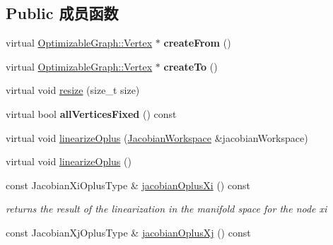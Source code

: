 \subsection*{Public 成员函数}
\begin{DoxyCompactItemize}
\item 
\hypertarget{classg2o_1_1BaseBinaryEdge_a32bfc93b6dede619c7d99db2fb60f80d}{virtual \hyperlink{classg2o_1_1OptimizableGraph_1_1Vertex}{Optimizable\-Graph\-::\-Vertex} $\ast$ {\bfseries create\-From} ()}\label{classg2o_1_1BaseBinaryEdge_a32bfc93b6dede619c7d99db2fb60f80d}

\item 
\hypertarget{classg2o_1_1BaseBinaryEdge_ac7cce17e3229445e5a33c3cb8a569320}{virtual \hyperlink{classg2o_1_1OptimizableGraph_1_1Vertex}{Optimizable\-Graph\-::\-Vertex} $\ast$ {\bfseries create\-To} ()}\label{classg2o_1_1BaseBinaryEdge_ac7cce17e3229445e5a33c3cb8a569320}

\item 
virtual void \hyperlink{classg2o_1_1BaseBinaryEdge_a06e64067fa5fff4a5e2d058249b55478}{resize} (size\-\_\-t size)
\item 
\hypertarget{classg2o_1_1BaseBinaryEdge_a1895c3b7141e93fd05bf271daeda7568}{virtual bool {\bfseries all\-Vertices\-Fixed} () const }\label{classg2o_1_1BaseBinaryEdge_a1895c3b7141e93fd05bf271daeda7568}

\item 
virtual void \hyperlink{classg2o_1_1BaseBinaryEdge_afc3b6470e7679f027c2614484b394925}{linearize\-Oplus} (\hyperlink{classg2o_1_1JacobianWorkspace}{Jacobian\-Workspace} \&jacobian\-Workspace)
\item 
virtual void \hyperlink{classg2o_1_1BaseBinaryEdge_af0fb8a693c8c7996fa65566e7263fbc4}{linearize\-Oplus} ()
\item 
\hypertarget{classg2o_1_1BaseBinaryEdge_ad036a59a5bc1d04d1799d61b9be15864}{const Jacobian\-Xi\-Oplus\-Type \& \hyperlink{classg2o_1_1BaseBinaryEdge_ad036a59a5bc1d04d1799d61b9be15864}{jacobian\-Oplus\-Xi} () const }\label{classg2o_1_1BaseBinaryEdge_ad036a59a5bc1d04d1799d61b9be15864}

\begin{DoxyCompactList}\small\item\em returns the result of the linearization in the manifold space for the node xi \end{DoxyCompactList}\item 
\hypertarget{classg2o_1_1BaseBinaryEdge_a8a8ed568c4a00f74943fc1efe5bbc72c}{const Jacobian\-Xj\-Oplus\-Type \& \hyperlink{classg2o_1_1BaseBinaryEdge_a8a8ed568c4a00f74943fc1efe5bbc72c}{jacobian\-Oplus\-Xj} () const }\label{classg2o_1_1BaseBinaryEdge_a8a8ed568c4a00f74943fc1efe5bbc72c}


\end{DoxyCompactItemize}
